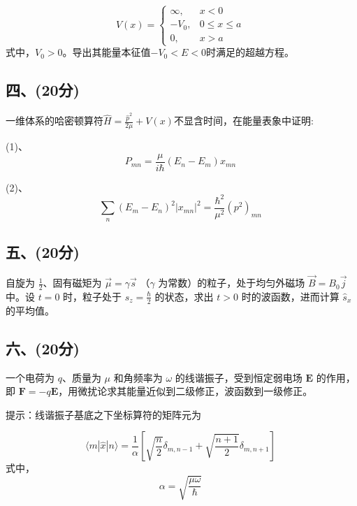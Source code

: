 \[
V(x) = \begin{cases} 
\infty, & x < 0 \\
-V_0, & 0 \leq x \leq a \\
0, & x > a
\end{cases}~
\] 
式中，$V_0>0$。导出其能量本征值$-V_0<E<0$时满足的超越方程。
\subsection{四、(20分)}
一维体系的哈密顿算符$\hat{H}=\frac{\hat{p}^2}{2\mu}+V(x)$不显含时间，在能量表象中证明:

(1)、$$P_{mn}=\frac{\mu}{i\hbar}(E_n-E_m)x_{mn}~$$

(2)、$$\sum_n (E_m - E_n)^2 |x_{mn}|^2 = \frac{\hbar^2}{\mu^2} (p^2)_{mn}~$$
\subsection{五、(20分)}
自旋为 $\frac{1}{2}$、固有磁矩为 $\vec{\mu} = \gamma \vec{s}$ （$\gamma$ 为常数）的粒子，处于均匀外磁场 $\vec{B} = B_0 \vec{j}$ 中。设 $t = 0$ 时，粒子处于 $s_z = \frac{\hbar}{2}$ 的状态，求出 $t > 0$ 时的波函数，进而计算 $\hat{s}_x$ 的平均值。
\subsection{六、(20分)}
一个电荷为 $q$、质量为 $\mu$ 和角频率为 $\omega$ 的线谐振子，受到恒定弱电场 $\mathbf{E}$ 的作用，即 $\mathbf{F} = -q \mathbf{E}$，用微扰论求其能量近似到二级修正，波函数到一级修正。

提示：线谐振子基底之下坐标算符的矩阵元为

$$\langle m | \hat{x} | n \rangle = \frac{1}{\alpha} \left[ \sqrt{\frac{n}{2}} \delta_{m, n-1} + \sqrt{\frac{n+1}{2}} \delta_{m, n+1} \right]~$$
式中，
$$\alpha = \sqrt{\frac{\mu \omega}{\hbar}}~$$